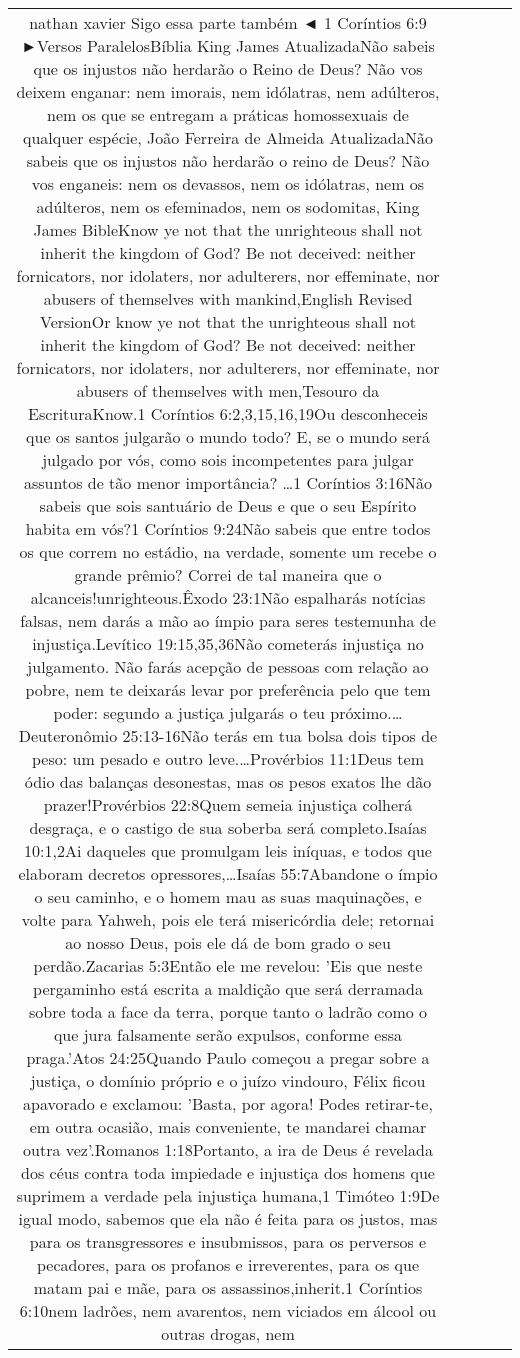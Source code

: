 \documentclass[11pt]{article}
\newlength\mylength
\begin{document}
\begin{center}
\begin{longtable}{|C{.65\mylength}|C{.30\mylength}|C{.12\mylength}|C{.12\mylength}|C{.12\mylength}|}
  \small nathan xavier  Sigo essa parte também ◄ 1 Coríntios 6:9 ►Versos ParalelosBíblia King James AtualizadaNão sabeis que os injustos não herdarão o Reino de Deus? Não vos deixem enganar: nem imorais, nem idólatras, nem adúlteros, nem os que se entregam a práticas homossexuais de qualquer espécie, João Ferreira de Almeida AtualizadaNão sabeis que os injustos não herdarão o reino de Deus? Não vos enganeis: nem os devassos, nem os idólatras, nem os adúlteros, nem os efeminados, nem os sodomitas,   King James BibleKnow ye not that the unrighteous shall not inherit the kingdom of God? Be not deceived: neither fornicators, nor idolaters, nor adulterers, nor effeminate, nor abusers of themselves with mankind,English Revised VersionOr know ye not that the unrighteous shall not inherit the kingdom of God? Be not deceived: neither fornicators, nor idolaters, nor adulterers, nor effeminate, nor abusers of themselves with men,Tesouro da EscrituraKnow.1 Coríntios 6:2,3,15,16,19Ou desconheceis que os santos julgarão o mundo todo? E, se o mundo será julgado por vós, como sois incompetentes para julgar assuntos de tão menor importância? …1 Coríntios 3:16Não sabeis que sois santuário de Deus e que o seu Espírito habita em vós?1 Coríntios 9:24Não sabeis que entre todos os que correm no estádio, na verdade, somente um recebe o grande prêmio? Correi de tal maneira que o alcanceis!unrighteous.Êxodo 23:1Não espalharás notícias falsas, nem darás a mão ao ímpio para seres testemunha de injustiça.Levítico 19:15,35,36Não cometerás injustiça no julgamento. Não farás acepção de pessoas com relação ao pobre, nem te deixarás levar por preferência pelo que tem poder: segundo a justiça julgarás o teu próximo.…Deuteronômio 25:13-16Não terás em tua bolsa dois tipos de peso: um pesado e outro leve.…Provérbios 11:1Deus tem ódio das balanças desonestas, mas os pesos exatos lhe dão prazer!Provérbios 22:8Quem semeia injustiça colherá desgraça, e o castigo de sua soberba será completo.Isaías 10:1,2Ai daqueles que promulgam leis iníquas, e todos que elaboram decretos opressores,…Isaías 55:7Abandone o ímpio o seu caminho, e o homem mau as suas maquinações, e volte para Yahweh, pois ele terá misericórdia dele; retornai ao nosso Deus, pois ele dá de bom grado o seu perdão.Zacarias 5:3Então ele me revelou: 'Eis que neste pergaminho está escrita a maldição que será derramada sobre toda a face da terra, porque tanto o ladrão como o que jura falsamente serão expulsos, conforme essa praga.'Atos 24:25Quando Paulo começou a pregar sobre a justiça, o domínio próprio e o juízo vindouro, Félix ficou apavorado e exclamou: 'Basta, por agora! Podes retirar-te, em outra ocasião, mais conveniente, te mandarei chamar outra vez'.Romanos 1:18Portanto, a ira de Deus é revelada dos céus contra toda impiedade e injustiça dos homens que suprimem a verdade pela injustiça humana,1 Timóteo 1:9De igual modo, sabemos que ela não é feita para os justos, mas para os transgressores e insubmissos, para os perversos e pecadores, para os profanos e irreverentes, para os que matam pai e mãe, para os assassinos,inherit.1 Coríntios 6:10nem ladrões, nem avarentos, nem viciados em álcool ou outras drogas, nem 
\end{longtable}
\end{center}
\end{document}
